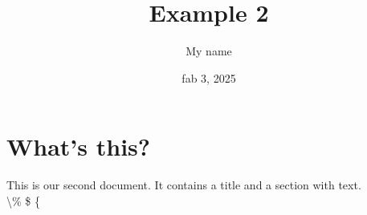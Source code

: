 \documentclass[a4paper, 11pt]{article}
\title{Example 2}
\author{My name}
\date{fab 3, 2025}
\begin{document}
\maketitle

\section{What's this?}
This is our second document. It contains a title and a section with text. \\ \textbackslash \% \$ \{
\end{document}
